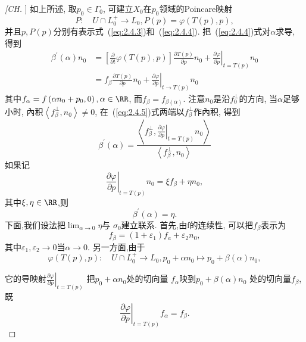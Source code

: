 \begin{proof}[[CH]]
  如上所述,
  取$p_0 \in \Gamma_0$,
  可建立$X_0$在$p_0$领域的Poincare映射
$$
P: \quad U \cap L_{0}^{+} \rightarrow L_{0}, P(p)=\varphi(T(p), p),
$$
并且$p,P(p)$分别有表示式~(\ref{eq:2.4.3})和~(\ref{eq:2.4.4}).
把~(\ref{eq:2.4.4})式对$\alpha$求导,
得到
\begin{equation}
  \label{eq:2.4.5}
  \begin{aligned} \beta^{\prime}(\alpha) n_{0} &=\left[\frac{\partial}{\partial t} \varphi(T(p), p)\right] \frac{\partial T(p)}{\partial p} n_{0}+\left.\frac{\partial \varphi}{\partial p}\right|_{t=T(p)} n_{0} \\ &=f_{\beta} \frac{\partial T(p)}{\partial p} n_{0}+\left.\frac{\partial \varphi}{\partial p}\right|_{t \rightarrow T(p)} n_{0} \end{aligned}
\end{equation}
其中$f_{\alpha}=f\left(\alpha n_{0}+p_{0}, 0\right), \alpha \in \RR$,
而$f_{\beta}=f_{\beta(\alpha)}$.
注意$n_0$是沿$f_{0}^{\perp}$的方向,
当$\alpha$足够小时,
內积$\left\langle f_{\beta}^{\perp}, n_{0}\right\rangle \neq 0$,
在~(\ref{eq:2.4.5})式两端以$f_{\beta}^{\perp}$作內积,
得到
$$
\beta^{\prime}(\alpha)=\frac{\left\langle f_{\beta}^{\perp},\left.\frac{\partial \varphi}{\partial p}\right|_{t=T(p)} n_{0}\right\rangle}{\left\langle f_{\beta}^{\perp}, n_{0}\right\rangle}
$$
如果记
\begin{equation}
  \label{eq:2.4.6}
  \left.\frac{\partial \varphi}{\partial p}\right|_{t=T(p)} n_{0}=\xi f_{\beta}+\eta n_{0},
\end{equation}
其中$\xi, \eta \in \RR$,则
\begin{equation}
  \label{eq:2.4.7}
  \beta^{\prime}(\alpha)=\eta.
\end{equation}
下面,我们设法把$\lim _{\alpha \to 0} \eta$与 $\sigma_0$建立联系.
首先,由f的连续性,
可以把$f_{\beta}$表示为
\begin{equation}
  \label{eq:2.4.8}
  f_{\beta}=\left(1+\varepsilon_{1}\right) f_{a}+\varepsilon_{2} n_{0},
\end{equation}
其中$\varepsilon_{1}, \varepsilon_{2} \rightarrow 0$当$\alpha \to 0$.
另一方面,由于
$$
\varphi(T(p), p) : \quad U \cap L_{0}^{+} \rightarrow L_{0}, p_{0}+\alpha n_{0} \mapsto p_{0}+\beta(\alpha) n_{0},
$$

它的导映射$\left.\frac{\partial \varphi}{\partial p}\right|_{t=T(p)}$
把$p_0+\alpha n_0$处的切向量 $f_{\alpha}$映到$p_{0}+\beta(\alpha) n_{0}$
处的切向量$f_{\beta}$,既
\begin{equation}
  \label{eq:2.4.9}
  \left.\frac{\partial \varphi}{\partial p}\right|_{t=T(p)} f_{\alpha}=f_{\beta}.
\end{equation}


\end{proof}
